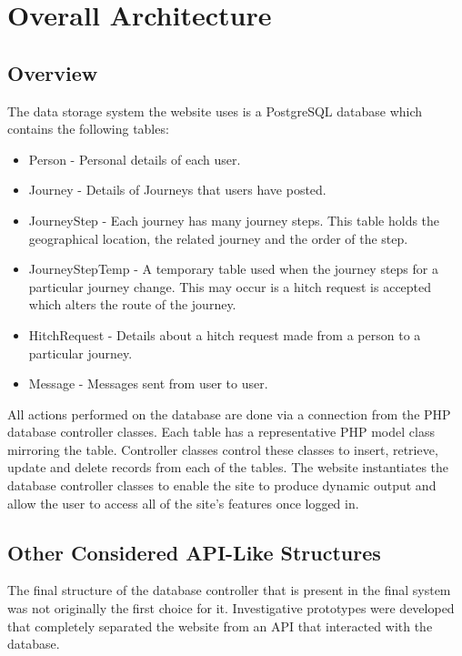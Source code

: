 \section{Overall Architecture}
	\subsection{Overview}	
		The data storage system the website uses is a PostgreSQL database which contains the following tables:
		\begin{itemize}
		\item Person - Personal details of each user.
		\item Journey - Details of Journeys that users have posted.
		\item Journey\textunderscore Step - Each journey has many journey steps. This table holds the geographical location, the related journey and the order of the step.
		\item Journey\textunderscore Step\textunderscore Temp - A temporary table used when the journey steps for a particular journey change. This may occur is a hitch request is accepted which alters the route of the journey.
		\item Hitch\textunderscore Request - Details about a hitch request made from a person to a particular journey.
		\item Message - Messages sent from user to user.
		\end{itemize}
		
		All actions performed on the database are done via a connection from the PHP database controller classes. Each table has a representative PHP model class mirroring the table. Controller classes control these classes to insert, retrieve, update and delete records from each of the tables. The website instantiates the database controller classes to enable the site to produce dynamic output and allow the user to access all of the site's features once logged in.
		
	\subsection{Other Considered API-Like Structures}
		The final structure of the database controller that is present in the final system was not originally the first choice for it. Investigative prototypes were developed that completely separated the website from an API that interacted with the database. 
		

